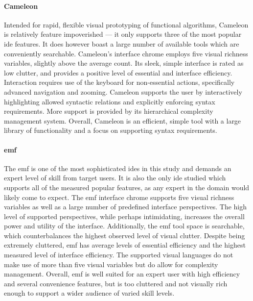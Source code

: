 \paragraph{Cameleon} Intended for rapid, flexible visual prototyping of
functional algorithms, Cameleon is relatively feature impoverished --- it
only supports three of the most popular \ac{ide} features. It does however
boast a large number of available tools which are conveniently searchable.
Cameleon's interface chrome employs five visual richness variables,
slightly above the average count. Its sleek, simple interface is rated as
low clutter, and provides a positive level of essential and interface
efficiency. Interaction requires use of the keyboard for non-essential
actions, specifically advanced navigation and zooming. Cameleon supports
the user by interactively highlighting allowed syntactic relations and
explicitly enforcing syntax requirements. More support is provided by its
hierarchical complexity management system. Overall, Cameleon is an
efficient, simple tool with a large library of functionality and a focus on
supporting syntax requirements.

\paragraph{\acl{emf}} The \ac{emf} is one of the most sophisticated
\acp{ide} in this study and demands an expert level of skill from target
users. It is also the only \ac{ide} studied which supports all of the
measured popular features, as any expert in the domain would likely come to
expect. The \ac{emf} interface chrome supports five visual richness
variables as well as a large number of predefined interface perspectives.
The high level of supported perspectives, while perhaps intimidating,
increases the overall power and utility of the interface. Additionally, the
\ac{emf} tool space is searchable, which counterbalances the highest
observed level of visual clutter. Despite being extremely cluttered,
\ac{emf} has average levels of essential efficiency and the highest
measured level of interface efficiency. The supported visual languages do
not make use of more than five visual variables but do allow for complexity
management. Overall, \ac{emf} is well suited for an expert user with high
efficiency and several convenience features, but is too cluttered and not
visually rich enough to support a wider audience of varied skill levels.


